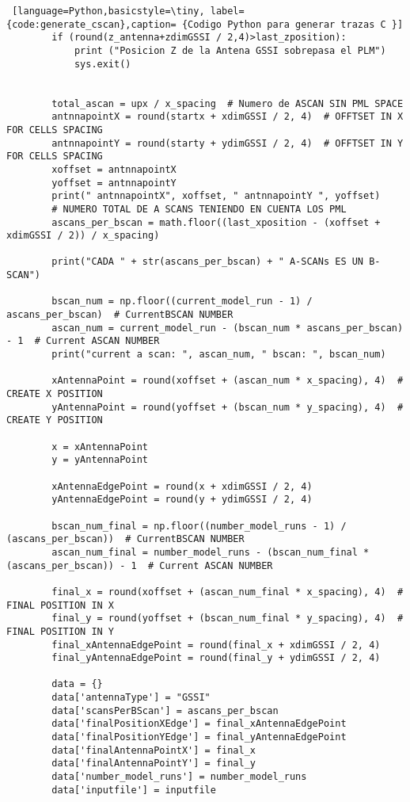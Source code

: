 \begin{lstlisting} [language=Python,basicstyle=\tiny, label={code:generate_cscan},caption= {Codigo Python para generar trazas C }]
        if (round(z_antenna+zdimGSSI / 2,4)>last_zposition):
            print ("Posicion Z de la Antena GSSI sobrepasa el PLM")
            sys.exit()


        total_ascan = upx / x_spacing  # Numero de ASCAN SIN PML SPACE
        antnnapointX = round(startx + xdimGSSI / 2, 4)  # OFFTSET IN X FOR CELLS SPACING
        antnnapointY = round(starty + ydimGSSI / 2, 4)  # OFFTSET IN Y FOR CELLS SPACING
        xoffset = antnnapointX
        yoffset = antnnapointY
        print(" antnnapointX", xoffset, " antnnapointY ", yoffset)
        # NUMERO TOTAL DE A SCANS TENIENDO EN CUENTA LOS PML
        ascans_per_bscan = math.floor((last_xposition - (xoffset + xdimGSSI / 2)) / x_spacing)

        print("CADA " + str(ascans_per_bscan) + " A-SCANs ES UN B-SCAN")

        bscan_num = np.floor((current_model_run - 1) / ascans_per_bscan)  # CurrentBSCAN NUMBER
        ascan_num = current_model_run - (bscan_num * ascans_per_bscan) - 1  # Current ASCAN NUMBER
        print("current a scan: ", ascan_num, " bscan: ", bscan_num)

        xAntennaPoint = round(xoffset + (ascan_num * x_spacing), 4)  # CREATE X POSITION
        yAntennaPoint = round(yoffset + (bscan_num * y_spacing), 4)  # CREATE Y POSITION

        x = xAntennaPoint
        y = yAntennaPoint

        xAntennaEdgePoint = round(x + xdimGSSI / 2, 4)
        yAntennaEdgePoint = round(y + ydimGSSI / 2, 4)

        bscan_num_final = np.floor((number_model_runs - 1) / (ascans_per_bscan))  # CurrentBSCAN NUMBER
        ascan_num_final = number_model_runs - (bscan_num_final * (ascans_per_bscan)) - 1  # Current ASCAN NUMBER

        final_x = round(xoffset + (ascan_num_final * x_spacing), 4)  # FINAL POSITION IN X
        final_y = round(yoffset + (bscan_num_final * y_spacing), 4)  # FINAL POSITION IN Y
        final_xAntennaEdgePoint = round(final_x + xdimGSSI / 2, 4)
        final_yAntennaEdgePoint = round(final_y + ydimGSSI / 2, 4)

        data = {}
        data['antennaType'] = "GSSI"
        data['scansPerBScan'] = ascans_per_bscan
        data['finalPositionXEdge'] = final_xAntennaEdgePoint
        data['finalPositionYEdge'] = final_yAntennaEdgePoint
        data['finalAntennaPointX'] = final_x
        data['finalAntennaPointY'] = final_y
        data['number_model_runs'] = number_model_runs
        data['inputfile'] = inputfile




\end{lstlisting}
